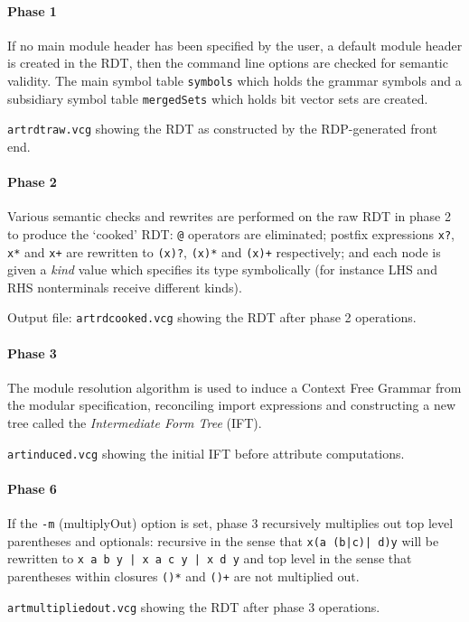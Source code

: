 \documentclass[11pt]{article}
\begin{document}
\paragraph{Phase 1}
If no main module header has been specified by the user, a default
module header is created in the RDT, then the command line options are
checked for semantic validity. The main symbol table
{\tt symbols} which holds the grammar symbols and a subsidiary symbol
table {\tt mergedSets} which holds bit vector sets are created.

 {\tt artrdtraw.vcg} showing the RDT as constructed by the RDP-generated front end.
\paragraph{Phase 2}
Various semantic checks and rewrites are performed on the raw RDT in
phase 2 to produce the `cooked' RDT: {\tt @} operators are eliminated;
postfix expressions {\tt x?}, {\tt x*} and {\tt x+} are rewritten to
{\tt (x)?}, {\tt (x)*} and {\tt (x)+} respectively; and each node is
given a {\em kind} value which specifies its type symbolically
(for instance LHS and RHS nonterminals receive different kinds).

Output file: {\tt artrdcooked.vcg} showing the RDT after phase 2 operations.

\paragraph{Phase 3}
The module resolution algorithm is used to induce a Context Free
Grammar from the modular specification, reconciling import expressions
and constructing a new tree called the {\em Intermediate Form Tree}
(IFT).

 {\tt artinduced.vcg} showing the initial IFT before attribute computations.

\paragraph{Phase 6}
If the {\tt -m} (multiplyOut) option is set, phase 3 recursively
multiplies out top level parentheses and optionals: recursive in the sense that
\verb+x(a (b|c)| d)y+ will be rewritten to
\verb+x a b y | x a c y | x d y+ and top level in the sense that
parentheses within closures \verb+()*+ and \verb!()+! are not multiplied out.

 {\tt artmultipliedout.vcg} showing the RDT after phase 3 operations.
\end{document}

